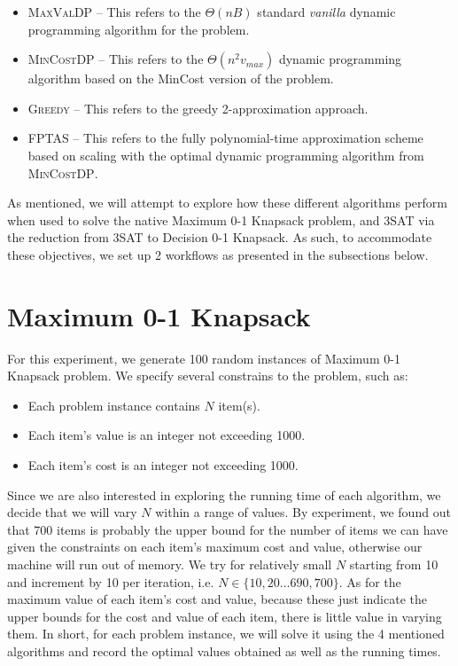\documentclass[12pt, oneside]{book}
\providecommand{\tightlist}{%
  \setlength{\itemsep}{0pt}\setlength{\parskip}{0pt}}
\begin{document}
\begin{itemize}
\tightlist
\item
  \textsc{MaxValDP} -- This refers to the \emph{\(\Theta(nB)\)} standard
  \emph{vanilla} dynamic programming algorithm for the problem.
\item
  \textsc{MinCostDP} -- This refers to the \emph{\(\Theta(n^2v_{max})\)}
  dynamic programming algorithm based on the MinCost version of the
  problem.
\item
  \textsc{Greedy} -- This refers to the greedy 2-approximation approach.
\item
  \textsc{FPTAS} -- This refers to the fully polynomial-time
  approximation scheme based on scaling with the optimal dynamic
  programming algorithm from \textsc{MinCostDP}.
\end{itemize}

As mentioned, we will attempt to explore how these different algorithms
perform when used to solve the native Maximum 0-1 Knapsack problem, and
3SAT via the reduction from 3SAT to Decision 0-1 Knapsack. As such, to
accommodate these objectives, we set up 2 workflows as presented in the
subsections below.

\section{Maximum 0-1 Knapsack}\label{maximum-0-1-knapsack}

For this experiment, we generate 100 random instances of Maximum 0-1
Knapsack problem. We specify several constrains to the problem, such as:

\begin{itemize}
\tightlist
\item
  Each problem instance contains \(N\) item(s).
\item
  Each item's value is an integer not exceeding 1000.
\item
  Each item's cost is an integer not exceeding 1000.
\end{itemize}

Since we are also interested in exploring the running time of each
algorithm, we decide that we will vary \(N\) within a range of values.
By experiment, we found out that 700 items is probably the upper bound
for the number of items we can have given the constraints on each item's
maximum cost and value, otherwise our machine will run out of memory. We
try for relatively small \(N\) starting from 10 and increment by 10 per
iteration, i.e. \(N \in \{10, 20 \ldots 690, 700\}\). As for the maximum
value of each item's cost and value, because these just indicate the
upper bounds for the cost and value of each item, there is little value
in varying them. In short, for each problem instance, we will solve it
using the 4 mentioned algorithms and record the optimal values obtained
as well as the running times.
\end{document}
